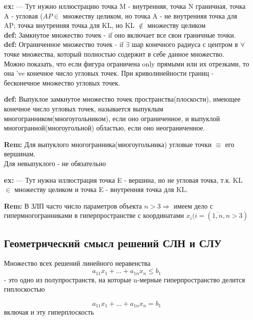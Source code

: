 \textbf{ex:}
--- Тут нужно иллюстрацию
точка M - внутренняя, точка N граничная, точка A - угловая ($AP \in$ множеству целиком, но точка A - не внутренняя точка для AP; точка внутренняя точка для KL, но KL $\notin$ множеству целиком \\

\textbf{def:} Замкнутое множество точек - if оно включает все свои граничные точки. \\

\textbf{def:} Ограниченное множество точек - if $\exists$ шар конечного радиуса с центром в $\forall$ точке множества, который полностью содержит в себе данное множество.  \\

Можно показать, что если фигура ограничена only прямыми или их отрезками, то она 've конечное число угловых точек. При криволинейности границ - бесконечное множество угловых точек.

\textbf{def:} Выпуклое замкнутое множество точек пространства(плоскости), имеющее конечное число угловых точек, называется выпуклым многогранником(многоугольником), если оно ограниченное, и выпуклой многогранной(многоугольной) областью, если оно неограниченное. \\

\newpage

\textbf{Rem:} Для выпуклого многогранника(многоугольника) угловые точки $\equiv$ его вершинам. \\
Для невыпуклого - не обязательно

\textbf{ex:} --- Тут нужна иллюстрация точка E - вершина, но не угловая точка, т.к. KL $\in$ множеству целиком и точка E - внутренняя точка для KL.

\textbf{Rem:} В ЗЛП часто число параметров объекта $n > 3 \Rightarrow$ имеем дело с гипермногогранниками в гиперпространстве с координатами $x_i (i = (\overline{1,n}, n > 3)$

\subsection*{Геометрический смысл решений СЛН и СЛУ}

\begin{theorem}
Множество всех решений линейного неравенства 
    \begin{equation*}
    a_{11} x_1 + ... + a_{1n}x_n \leq b_1
    \end{equation*} - это одно из полупространств, на которые n-мерные гиперпространство делится гиплоскостью
    
    \begin{equation*}
    a_{11} x_1 + ... + a_{1n}x_n = b_1
    \end{equation*} включая и эту гиперплоскость   
\end{theorem}

